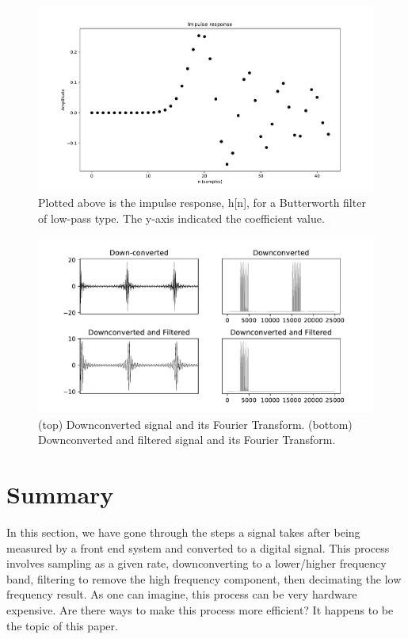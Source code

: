 \documentclass{report}
\begin{document}
\begin{figure}[!ht]
\includegraphics[scale=.4]{Figure_3.pdf}
\caption{Plotted above is the impulse response, h[n], for a Butterworth filter of low-pass type.  The y-axis indicated the coefficient value.}
\end{figure} 
\begin{figure}[!ht]
\includegraphics[scale=.6]{Figure_5.pdf}
\caption{(top) Downconverted signal and its Fourier Transform.  (bottom) Downconverted and filtered signal and its Fourier Transform.}
\end{figure} 



\section{Summary}
In this section, we have gone through the steps a signal takes after being measured by a front end system and converted to a digital signal.  This process involves sampling as a given rate, downconverting to a lower/higher frequency band, filtering to remove the high frequency component, then decimating the low frequency result.  As one can imagine, this process can be very hardware expensive.  Are there ways to make this process more efficient? It happens to be the topic of this paper.
\end{document}
